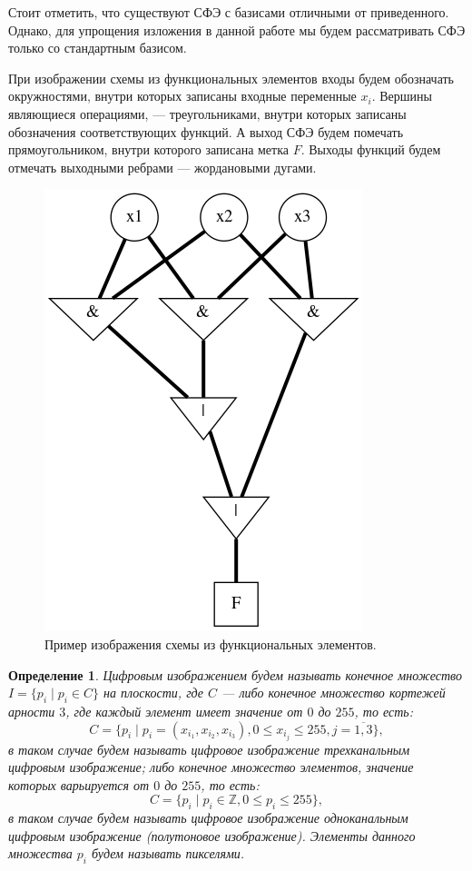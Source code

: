 \documentclass[makeidx, a4paper, 14pt]{extarticle}
\newcommand{\Z}{\mathbb{Z}}
\newtheorem{definition}{Определение}
\begin{document}
Стоит отметить, что существуют СФЭ с базисами отличными от приведенного. Однако, для упрощения изложения в данной работе мы будем рассматривать СФЭ
только со стандартным базисом.

При изображении схемы из функциональных элементов входы будем обозначать окружностями, внутри которых записаны входные переменные $x_i$.
Вершины являющиеся операциями, --- треугольниками, внутри которых записаны обозначения соответствующих функций.
А выход СФЭ будем помечать прямоугольником, внутри которого записана метка $F$. Выходы функций будем отмечать
выходными ребрами --- жордановыми дугами.

\begin{figure}[!h]
    \centering
    \includegraphics[scale=0.75]{img4.png}
    \caption{Пример изображения схемы из функциональных элементов.}
\end{figure}

\begin{definition}
    Цифровым изображением будем называть конечное множество ${I = \{p_i \mid p_i \in C\}}$ на плоскости,
    где $C$ --- либо конечное множество кортежей арности $3$, где каждый элемент имеет значение от $0$ до $255$,
    то есть: \[ {C=\{p_i \mid p_i=({x_{i_1}}, {x_{i_2}}, {x_{i_3}}), 0 \leq {x_{i_j}} \leq 255, j=\overline{1,3}\}}, \]
    в таком случае будем называть цифровое изображение трехканальным цифровым изображение;
    либо конечное множество элементов, значение которых варьируется от $0$ до $255$, то есть: \[ {C=\{p_i \mid p_i \in \Z, 0 \leq p_i \leq 255\}}, \]
    в таком случае будем называть цифровое изображение одноканальным цифровым изображение (полутоновое изображение). Элементы данного множества $p_i$ будем называть пикселями.
\end{definition}
\end{document}
